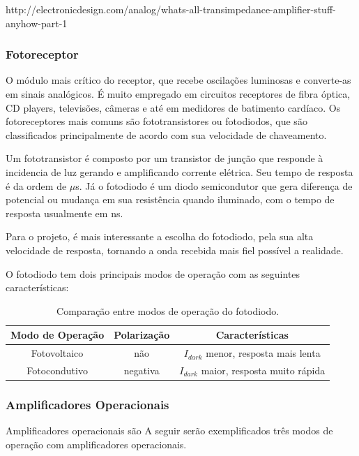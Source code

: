 	http://electronicdesign.com/analog/whats-all-transimpedance-amplifier-stuff-anyhow-part-1

	\subsubsection{Fotoreceptor}\label{hard-photodiode}
	
	O módulo mais crítico do receptor, que recebe oscilações luminosas e converte-as em sinais analógicos. É muito empregado em circuitos receptores de fibra óptica, CD players, televisões, câmeras e até em medidores de batimento cardíaco. Os fotoreceptores mais comuns são fototransistores ou fotodiodos, que são classificados principalmente de acordo com sua velocidade de chaveamento. 
	
	Um fototransistor é composto por um transistor de junção que responde à incidencia de luz gerando e amplificando corrente elétrica. Seu tempo de resposta é da ordem de $\mu$s. Já o fotodiodo é um diodo semicondutor que gera diferença de potencial ou mudança em sua resistência quando iluminado, com o tempo de resposta usualmente em ns.
	
	Para o projeto, é mais interessante a escolha do fotodiodo, pela sua alta velocidade de resposta, tornando a onda recebida mais fiel possível a realidade.
	
	O fotodiodo tem dois principais modos de operação com as seguintes características:
	
	\begin{table}[ht]
		\caption{Comparação entre modos de operação do fotodiodo.}
		\centering
		\begin{tabular}{c c c}
			\hline
			Modo de Operação  & Polarização & Características \\ \hline
			Fotovoltaico & não & $I_{dark}$ menor, resposta mais lenta \\
			Fotocondutivo & negativa & $I_{dark}$ maior, resposta muito rápida \\ \hline
		\end{tabular}
		\label{tab_photodiode_comp}
	\end{table}
	
	\subsubsection{Amplificadores Operacionais}\label{hard-opamp}
	
	Amplificadores operacionais são 
	A seguir serão exemplificados três modos de operação com amplificadores operacionais. 

